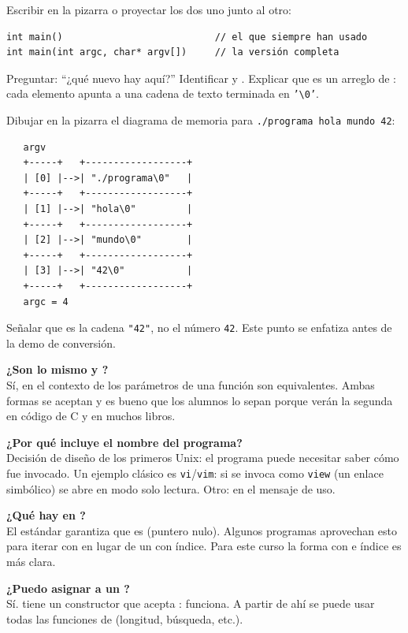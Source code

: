 \documentclass[12pt, oneside]{article}
\begin{document}
\begin{notaprofesor}
  Escribir en la pizarra o proyectar los dos  uno junto al otro:
  \begin{verbatim}
int main()                           // el que siempre han usado
int main(int argc, char* argv[])     // la versión completa
  \end{verbatim}
  Preguntar: ``¿qué nuevo hay aquí?''  Identificar  y
  .  Explicar que  es un arreglo de
  : cada elemento apunta a una cadena de texto terminada en
  \texttt{'\textbackslash{}0'}.

  \medskip
  Dibujar en la pizarra el diagrama de memoria para
  \texttt{./programa hola mundo 42}:
  \begin{verbatim}
   argv
   +-----+   +------------------+
   | [0] |-->| "./programa\0"   |
   +-----+   +------------------+
   | [1] |-->| "hola\0"         |
   +-----+   +------------------+
   | [2] |-->| "mundo\0"        |
   +-----+   +------------------+
   | [3] |-->| "42\0"           |
   +-----+   +------------------+
   argc = 4
  \end{verbatim}
  Señalar que  es la cadena \texttt{"42"}, no el número
  \texttt{42}.  Este punto se enfatiza antes de la demo de conversión.
\end{notaprofesor}

\begin{notaprofesor}

  \textbf{¿Son lo mismo  y ?}\\
  Sí, en el contexto de los parámetros de una función son equivalentes.
  Ambas formas se aceptan y es bueno que los alumnos lo sepan porque
  verán la segunda en código de C y en muchos libros.

  \medskip
  \textbf{¿Por qué  incluye el nombre del programa?}\\
  Decisión de diseño de los primeros Unix: el programa puede necesitar
  saber cómo fue invocado.  Un ejemplo clásico es \texttt{vi}/\texttt{vim}:
  si se invoca como \texttt{view} (un enlace simbólico) se abre en modo
  solo lectura.  Otro:  en el mensaje de uso.

  \medskip
  \textbf{¿Qué hay en ?}\\
  El estándar garantiza que  es  (puntero
  nulo).  Algunos programas aprovechan esto para iterar con
   en lugar de un  con índice.  Para este
  curso la forma con  e índice es más clara.

  \medskip
  \textbf{¿Puedo asignar  a un ?}\\
  Sí.   tiene un constructor que acepta :
   funciona.  A partir de ahí se puede usar
  todas las funciones de  (longitud, búsqueda, etc.).

\end{notaprofesor}
\end{document}

